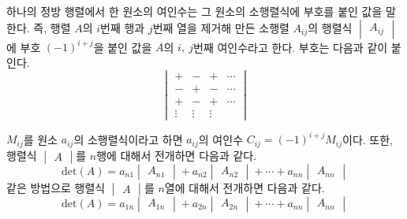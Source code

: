 \begin{tcolorbox}[colback = white, colframe = Definition, title = \textmd{정의: 여인수}]
    하나의 정방 행렬에서 한 원소의 여인수는 그 원소의 소행렬식에 부호를 붙인 값을 말한다. 
    즉, 행렬 $A$의 $i$번째 행과 $j$번째 열을 제거해 만든 소행렬 $A_{ij}$의 행렬식 $\begin{vmatrix} A_{ij} \end{vmatrix}$에 부호 $(-1)^{i+j}$을 붙인 값을 $A$의 $i, \ j$번째 여인수라고 한다. 부호는 다음과 같이 붙인다.
    \[ \begin{vmatrix} + & - & + & \cdots \\ - &+ & - &  \cdots  \\ + & - & + & \cdots \\ \vdots  & \vdots  & \vdots 
    \end{vmatrix}  \]
\end{tcolorbox}

\begin{tcolorbox}[colback = white, colframe = Theorem, title = \textmd{정리: 여인수 전개(라플라스 전개)}]
    $M_{ij}$를 원소 $a_{ij}$의 소행렬식이라고 하면  $a_{ij}$의 여인수 $C_{ij} = (-1)^{i+ j}M_{ij}$이다. 
    또한, 행렬식 $\begin{vmatrix} A \end{vmatrix}$를 $n$행에 대해서 전개하면 다음과 같다.
    \[ \text{det}(A) = a_{n1}\begin{vmatrix} A_{n1} \end{vmatrix} + a_{n2}\begin{vmatrix} A_{n2} \end{vmatrix} + \cdots + a_{nn}\begin{vmatrix} A_{nn} \end{vmatrix} \]
    같은 방법으로 행렬식 $\begin{vmatrix} A \end{vmatrix}$를 $n$열에 대해서 전개하면 다음과 같다.
    \[ \text{det}(A) = a_{1n}\begin{vmatrix} A_{1n} \end{vmatrix} + a_{2n}\begin{vmatrix} A_{2n} \end{vmatrix} + \cdots + a_{nn}\begin{vmatrix} A_{nn} \end{vmatrix} \]
\end{tcolorbox}
